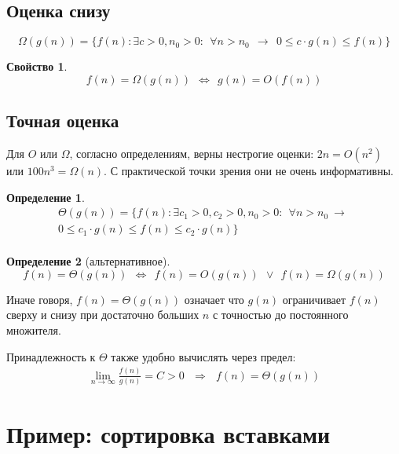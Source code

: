 \documentclass[12pt,a4paper]{report}
\newtheorem*{definition}{Определение}
\newtheorem*{property}{Свойство}
\begin{document}
\subsection*{Оценка снизу}

$$
\Omega(g(n)) = \{f(n) : \exists c>0, n_0>0:~~ \forall n > n_0 ~~\to~~ 0 \leqslant c \cdot g(n) \leqslant f(n)\}
$$

\begin{property}
$$
f(n) = \Omega(g(n))   ~~\Leftrightarrow~~  g(n) = O(f(n))
$$
\end{property}


\subsection*{Точная оценка}

Для $O$ или $\Omega$, согласно определениям, верны нестрогие оценки: $2n = O(n^2)$ или $100n^3 = \Omega(n)$. С практической точки зрения они не очень информативны.

\begin{definition}
$$
  \begin{gathered}
  \Theta(g(n)) = \{f(n) : \exists c_1>0, c_2>0, n_0>0:~~ \forall n > n_0 ~\to~\\
  0 \leqslant c_1 \cdot g(n) \leqslant f(n) \leqslant c_2 \cdot g(n)\} \\
  \end{gathered}
$$
\end{definition}

\begin{definition}[альтернативное]
$$
  f(n) = \Theta(g(n)) ~~\Leftrightarrow~~  f(n) = O(g(n)) ~~\vee~~ f(n) = \Omega(g(n))
$$
\end{definition}

Иначе говоря, $f(n)=\Theta(g(n))$ означает что $g(n)$ ограничивает $f(n)$ сверху и снизу при достаточно больших $n$ с точностью до постоянного множителя.

Принадлежность к $\Theta$ также удобно вычислять через предел:
$$
\begin{gathered}
\lim_{n\to\infty} \frac{f(n)}{g(n)} = C > 0   ~~~\Rightarrow~~~   f(n) = \Theta(g(n))
\end{gathered}
$$

\newpage

\section{Пример: сортировка вставками}
\end{document}
